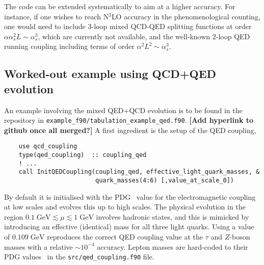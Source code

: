 \documentclass[12pt]{article}
\newcommand{\GeV}{\;\mathrm{GeV}}
\newcommand{\as}{\alpha_s}
\newcommand{\comment}[1]{\textbf{[#1]}}
\newcommand{\hoppet}{\textsc{hoppet}\xspace}
\newcommand{\ttt}[1]{\texttt{#1}}
\begin{document}
%
The code can be extended systematically to aim at a higher
accuracy. For instance, if one wishes to reach N$^3$LO accuracy in the
phenomenological counting, one would need to include 3-loop mixed
QCD-QED splitting functions at order $\alpha \as^2 L \sim \as^3$,
which are currently not available, and the well-known 2-loop QED
running coupling including terms of order $\alpha^2 L^2 \sim \as^3$.
%
%

\subsection{Worked-out example using QCD+QED evolution}


An example involving the mixed QED+QCD evolution is to be found in the
repository in
\ttt{example\_f90/tabulation\_example\_qed.f90}. \comment{Add
  hyperlink to github once all merged?}
%
A first ingredient is the setup of the QED coupling,
\begin{lstlisting}
    use qcd_coupling
    type(qed_coupling)  :: coupling_qed
    ! ...
    call InitQEDCoupling(coupling_qed, effective_light_quark_masses, &
                         quark_masses(4:6) [,value_at_scale_0])
\end{lstlisting}
By default it is initialised with the PDG~\cite{ParticleDataGroup:2022pth} value for the
electromagnetic coupling at low scales and evolves this up to high
scales.
%
The physical evolution in the region
$0.1\GeV \lesssim \mu \lesssim 1\GeV$ involves hadronic states, and
this is mimicked by introducing an effective (identical) mass for all
three light quarks.
%
Using a value of $0.109\GeV$ reproduces the correct QED coupling value at
the $\tau$ and $Z$-boson masses with a relative $\sim 10^{-4}$
accuracy.
%
Lepton masses are hard-coded to their PDG
values~\cite{ParticleDataGroup:2022pth} in the
\ttt{src/qed\_coupling.f90} file.
\end{document}
